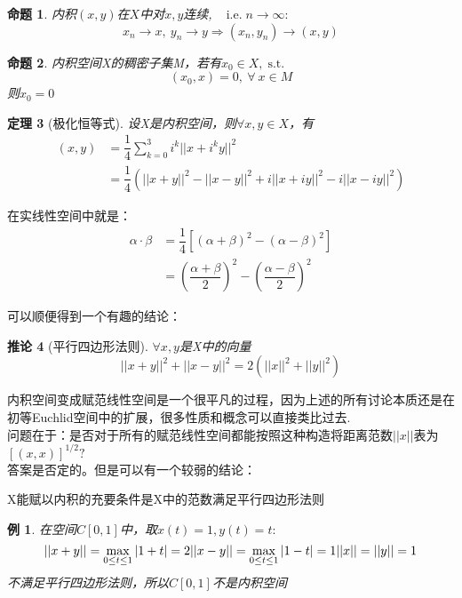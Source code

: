 \documentclass[12pt, a4paper, oneside, fontset=windows]{ctexbook}
\newtheorem{theorem}{定理}[section]
\newtheorem{corollary}[theorem]{推论}
\newtheorem{example}{例}[section]
\newtheorem{proposition}[theorem]{命题}
\DeclareMathOperator{\st}{\mathrm{s.t.}}
\DeclareMathOperator{\ie}{\mathrm{i.e.}}
\begin{document}
    \begin{proposition}
        内积$(x,y)$在$X$中对$x,y$连续, \ $\ie n\to \infty:$
        \[
            x_n \to x,\ y_n \to y \Rightarrow (x_n,y_n) \to (x,y)
        \]
    \end{proposition}
    \begin{proposition}
        内积空间X的稠密子集M，若有$x_0\in X,\st$
        \[ (x_0,x)=0,\ \forall\  x\in M\]
        则$x_0=0$
    \end{proposition}
    \begin{theorem}[极化恒等式]
        设X是内积空间，则$\forall x,y\in X$，有
        \begin{align*}
            (x,y)&=\dfrac{1}{4}\sum_{k=0}^3 i^k ||x+i^k y||^2\\
            & = \dfrac{1}{4}(||x+y||^2 - ||x-y||^2 + i||x+iy||^2 - i||x-iy||^2)
        \end{align*}
    \end{theorem}
    \begin{tcolorbox}
        在实线性空间中就是：
        \begin{align*}
                \alpha \cdot \beta &=\dfrac{1}{4}\left[ ( \alpha + \beta ) ^2 - ( \alpha - \beta ) ^2\right]\\
                & = \left(\dfrac{\alpha + \beta}{2}\right)^2 - \left(\dfrac{\alpha - \beta}{2}\right)^2
        \end{align*}
        
    \end{tcolorbox}
    可以顺便得到一个有趣的结论：\\
    \begin{corollary}[平行四边形法则]
        $\forall x,y$是X中的向量
        \[
            ||x+y||^2 + ||x-y||^2 = 2(||x||^2 + ||y||^2)
        \]
        \begin{center}
        \end{center}
    \end{corollary}

    内积空间变成赋范线性空间是一个很平凡的过程，因为上述的所有讨论本质还是在初等Euchlid空间中的扩展，很多性质和概念可以直接类比过去.\\
    问题在于：是否对于所有的赋范线性空间都能按照这种构造将距离范数$||x||$表为$[(x,x)]^{1/2}?$\\
    答案是否定的。但是可以有一个较弱的结论：
    {\bf 
    \begin{center}
        X能赋以内积的充要条件是X中的范数满足平行四边形法则
    \end{center}
    }
    \begin{example}
        在空间$C[0,1]$中，取$x(t)=1,y(t)=t:$
        \[
            ||x+y||=\max_{0 \le t \le 1}|1+t|=2\\
            ||x-y||=\max_{0 \le t \le 1}|1-t|=1\\
            ||x||=||y||=1
        \]
        不满足平行四边形法则，所以$C[0,1]$不是内积空间
    \end{example}
\end{document}
